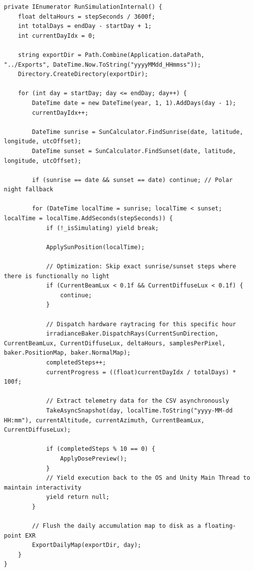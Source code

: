 \begin{lstlisting}[language={[Sharp]C}, caption={LightDoseSimulator.cs: The Coroutine driving dynamic time-stepping, asynchronous telemetry extraction, and synchronous EXR flushing.}, label={lst:timeloop}]
private IEnumerator RunSimulationInternal() {
    float deltaHours = stepSeconds / 3600f;
    int totalDays = endDay - startDay + 1;
    int currentDayIdx = 0;

    string exportDir = Path.Combine(Application.dataPath, "../Exports", DateTime.Now.ToString("yyyyMMdd_HHmmss"));
    Directory.CreateDirectory(exportDir);

    for (int day = startDay; day <= endDay; day++) {
        DateTime date = new DateTime(year, 1, 1).AddDays(day - 1);
        currentDayIdx++;
        
        DateTime sunrise = SunCalculator.FindSunrise(date, latitude, longitude, utcOffset);
        DateTime sunset = SunCalculator.FindSunset(date, latitude, longitude, utcOffset);
        
        if (sunrise == date && sunset == date) continue; // Polar night fallback
        
        for (DateTime localTime = sunrise; localTime < sunset; localTime = localTime.AddSeconds(stepSeconds)) {
            if (!_isSimulating) yield break;
            
            ApplySunPosition(localTime);
            
            // Optimization: Skip exact sunrise/sunset steps where there is functionally no light
            if (CurrentBeamLux < 0.1f && CurrentDiffuseLux < 0.1f) {
                continue;
            }

            // Dispatch hardware raytracing for this specific hour
            irradianceBaker.DispatchRays(CurrentSunDirection, CurrentBeamLux, CurrentDiffuseLux, deltaHours, samplesPerPixel, baker.PositionMap, baker.NormalMap);
            completedSteps++;
            currentProgress = ((float)currentDayIdx / totalDays) * 100f;
            
            // Extract telemetry data for the CSV asynchronously
            TakeAsyncSnapshot(day, localTime.ToString("yyyy-MM-dd HH:mm"), currentAltitude, currentAzimuth, CurrentBeamLux, CurrentDiffuseLux);

            if (completedSteps % 10 == 0) { 
                ApplyDosePreview(); 
            }
            // Yield execution back to the OS and Unity Main Thread to maintain interactivity
            yield return null;
        }
        
        // Flush the daily accumulation map to disk as a floating-point EXR
        ExportDailyMap(exportDir, day);
    }
}
\end{lstlisting}

